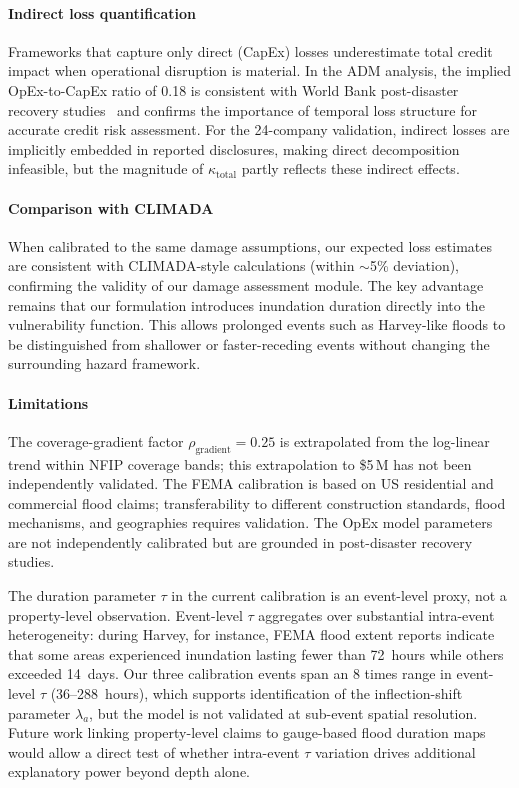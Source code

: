 \paragraph{Indirect loss quantification}
Frameworks that capture only direct (CapEx) losses underestimate total credit impact when operational disruption is material. In the ADM analysis, the implied OpEx-to-CapEx ratio of 0.18 is consistent with World Bank post-disaster recovery studies~\cite{hallegatte2015indirect} and confirms the importance of temporal loss structure for accurate credit risk assessment. For the 24-company validation, indirect losses are implicitly embedded in reported disclosures, making direct decomposition infeasible, but the magnitude of $\kappa_{\text{total}}$ partly reflects these indirect effects.

\paragraph{Comparison with CLIMADA}
When calibrated to the same damage assumptions, our expected loss estimates are consistent with CLIMADA-style calculations (within $\sim$5\% deviation), confirming the validity of our damage assessment module. The key advantage remains that our formulation introduces inundation duration directly into the vulnerability function. This allows prolonged events such as Harvey-like floods to be distinguished from shallower or faster-receding events without changing the surrounding hazard framework.

\paragraph{Limitations}
The coverage-gradient factor $\rho_{\text{gradient}} = 0.25$ is extrapolated from the log-linear trend within NFIP coverage bands; this extrapolation to \$5\,M has not been independently validated. The FEMA calibration is based on US residential and commercial flood claims; transferability to different construction standards, flood mechanisms, and geographies requires validation. The OpEx model parameters are not independently calibrated but are grounded in post-disaster recovery studies.

The duration parameter $\tau$ in the current calibration is an event-level proxy, not a property-level observation. Event-level $\tau$ aggregates over substantial intra-event heterogeneity: during Harvey, for instance, FEMA flood extent reports indicate that some areas experienced inundation lasting fewer than 72~hours while others exceeded 14~days. Our three calibration events span an 8 times range in event-level $\tau$ (36--288~hours), which supports identification of the inflection-shift parameter $\lambda_a$, but the model is not validated at sub-event spatial resolution. Future work linking property-level claims to gauge-based flood duration maps would allow a direct test of whether intra-event $\tau$ variation drives additional explanatory power beyond depth alone.

